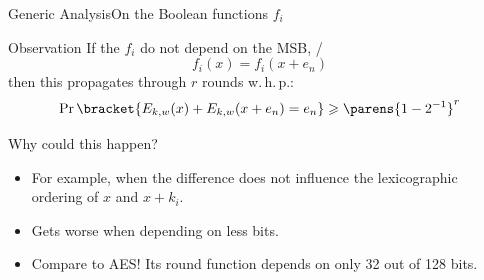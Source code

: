 \begin{frame}{Generic Analysis}{On the Boolean functions $f_i$}
    \vspace{-20pt}
    \begin{minipage}[t][85pt][t]{0.47\textwidth}
        \begin{block}{Observation\vpPp}
            If the $f_i$ do not depend on the MSB, \ie/
            \begin{equation*}
                f_i(x) = f_i(x + e_n)
            \end{equation*}
            then this propagates through $r$ rounds w.\,h.\,p.:
            \begin{equation*}
                \Prob\bracket{E_{k,w}(x) + E_{k,w}(x + e_n) = e_n} \geqslant \parens{1 - 2^{-1}}^r
            \end{equation*}
        \end{block}
    \end{minipage}
    \hfill
    \begin{minipage}[t][85pt][t]{0.47\textwidth}
        \begin{block}{Why could this happen?}
            \begin{itemize}
                \item For example, when the difference does not influence the lexicographic ordering of $x$ and $x + k_i$.
                \item Gets worse when depending on less bits.
                \item Compare to AES\@! Its round function depends on only 32 out of 128 bits.
            \end{itemize}
        \end{block}
    \end{minipage}

    \vspace{50pt}

    \begin{minipage}{0.985\textwidth}
    \end{minipage}
\end{frame}

